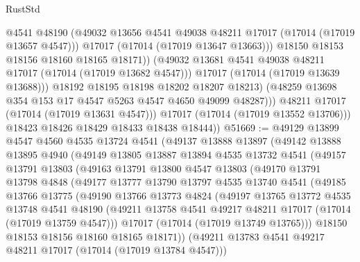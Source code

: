 \begin{lexlean}{RustStd}
\begin{coremodule}
{\begin{coremodule}
{{{{{{{{{{{{{{{{{{{{{{{{{{{{{{{{{{{{{{{{{{{{{{{{{{{{{{{                          @4541
                          @48190
                          (@49032 @13656 @4541 @49038 @48211 @17017 (@17014 (@17019 @13657 @4547)))
                          @17017
                          (@17014 (@17019 @13647 @13663)))
                        @18150
                        @18153
                        @18156
                        @18160
                        @18165
                        @18171))
                    (@49032 @13681 @4541 @49038 @48211 @17017 (@17014 (@17019 @13682 @4547)))
                    @17017
                    (@17014 (@17019 @13639 @13688)))
                  @18192
                  @18195
                  @18198
                  @18202
                  @18207
                  @18213)
                (@48259 @13698 @354 @153 @17 @4547 @5263 @4547 @4650 @49099 @48287)))
            @48211
            @17017
            (@17014 (@17019 @13631 @4547)))
          @17017
          (@17014 (@17019 @13552 @13706)))
        @18423
        @18426
        @18429
        @18433
        @18438
        @18444))
@51669 := @49129
    @13899
    @4547
    @4560
    @4535
    @13724
    @4541
    (@49137
      @13888
      @13897
      (@49142
        @13888
        @13895
        @4940
        (@49149
          @13805
          @13887
          @13894
          @4535
          @13732
          @4541
          (@49157
            @13791
            @13803
            (@49163
              @13791
              @13800
              @4547
              @13803
              (@49170
                @13791
                @13798
                @4848
                (@49177
                  @13777
                  @13790
                  @13797
                  @4535
                  @13740
                  @4541
                  (@49185
                    @13766
                    @13775
                    (@49190
                      @13766
                      @13773
                      @4824
                      (@49197
                        @13765
                        @13772
                        @4535
                        @13748
                        @4541
                        @48190
                        (@49211 @13758 @4541 @49217 @48211 @17017 (@17014 (@17019 @13759 @4547)))
                        @17017
                        (@17014 (@17019 @13749 @13765)))
                      @18150
                      @18153
                      @18156
                      @18160
                      @18165
                      @18171))
                  (@49211 @13783 @4541 @49217 @48211 @17017 (@17014 (@17019 @13784 @4547)))
}}}}}}}}}}}}}}}}}}}}}}}}}}}}}}}}}}}}}}}}}}}}}}}}}}}}}}}
\end{coremodule}}
\end{coremodule}
\end{lexlean}
